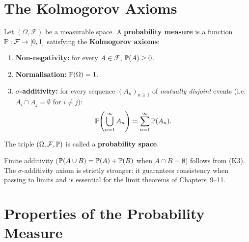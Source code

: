 \section{The Kolmogorov Axioms}

\begin{definition}
\label{def:prob_measure}
Let $(\Omega, \mathcal{F})$ be a measurable space. A \textbf{probability measure}
is a function $\mathbb{P} : \mathcal{F} \to [0,1]$ satisfying the \textbf{Kolmogorov axioms}:
\begin{enumerate}[label=\bfseries (K\arabic*)]
    \item \textbf{Non-negativity:} for every $A \in \mathcal{F}$,
          $\mathbb{P}(A) \geq 0$.
    \item \textbf{Normalisation:} $\mathbb{P}(\Omega) = 1$.
    \item \textbf{$\sigma$-additivity:} for every sequence $(A_n)_{n \geq 1}$
          of \emph{mutually disjoint} events (i.e.\ $A_i \cap A_j = \emptyset$
          for $i \neq j$):
          \[
              \mathbb{P}\!\left(\bigcup_{n=1}^{\infty} A_n\right)
              = \sum_{n=1}^{\infty} \mathbb{P}(A_n).
          \]
\end{enumerate}
\end{definition}

\begin{definition}
The triple $(\Omega, \mathcal{F}, \mathbb{P})$ is called a \textbf{probability space}.
\end{definition}

\begin{warning}[title=\textbf{Finite vs.\ $\sigma$-additivity}]
Finite additivity ($\mathbb{P}(A \cup B) = \mathbb{P}(A) + \mathbb{P}(B)$ when $A \cap B = \emptyset$)
follows from (K3). The $\sigma$-additivity axiom is strictly stronger: it guarantees
consistency when passing to limits and is essential for the limit theorems of
Chapters~9--11.
\end{warning}

\section{Properties of the Probability Measure}

